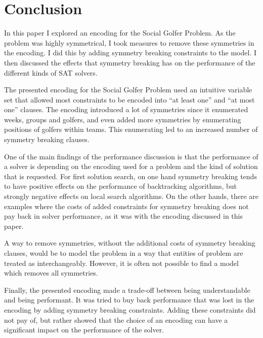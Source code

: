 \documentclass[a4paper]{scrartcl}
\begin{document}
\section{Conclusion}

In this paper I explored an encoding for the Social Golfer Problem. As the problem was highly symmetrical, I took measures to remove these symmetries in the encoding. I did this by adding symmetry breaking constraints to the model. I then discussed the effects that symmetry breaking has on the performance of the different kinds of SAT solvers.

The presented encoding for the Social Golfer Problem used an intuitive variable set that allowed most constraints to be encoded into ``at least one'' and ``at most one'' clauses. The encoding introduced a lot of symmetries since it enumerated weeks, groups and golfers, and even added more symmetries by enumerating positions of golfers within teams. This enumerating led to an increased number of symmetry breaking clauses.

One of the main findings of the performance discussion is that the performance of a solver is depending on the encoding used for a problem and the kind of solution that is requested. For first solution search, on one hand symmetry breaking tends to have positive effects on the performance of backtracking algorithms, but strongly negative effects on local search algorithms. On the other hands, there are examples where the costs of added constraints for symmetry breaking does not pay back in solver performance, as it was with the encoding discussed in this paper.

A way to remove symmetries, without the additional costs of symmetry breaking clauses, would be to model the problem in a way that entities of problem are treated as interchangeably. However, it is often not possible to find a model which removes all symmetries.

Finally, the presented encoding made a trade-off between being understandable and being performant. It was tried to buy back performance that was lost in the encoding by adding symmetry breaking constraints. Adding these constraints did not pay of, but rather showed that the choice of an encoding can have a significant impact on the performance of the solver.



\end{document}
